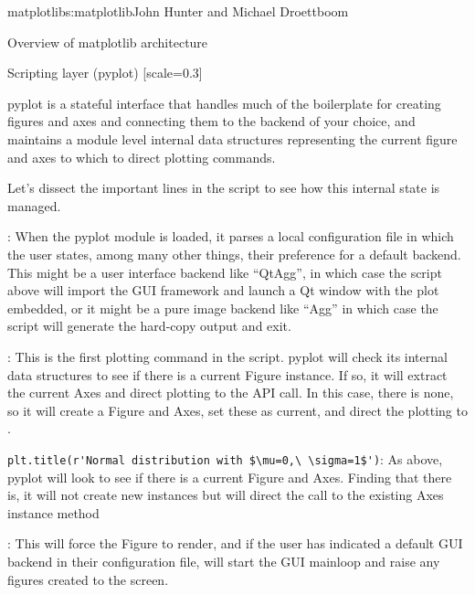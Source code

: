 \begin{aosachapter}{matplotlib}{s:matplotlib}{John Hunter and Michael Droettboom}
\begin{aosasect1}{Overview of matplotlib architecture}
\begin{aosasect2}{Scripting layer (pyplot)}
[scale=0.3]


pyplot is a stateful interface that handles much of the boilerplate
for creating figures and axes and connecting them to the backend of
your choice, and maintains a module level internal data structures
representing the current figure and axes to which to direct plotting
commands.

Let's dissect the important lines in the script to see how this
internal state is managed.

\begin{aosaitemize}

  \item {}: When the pyplot module
    is loaded, it parses a local configuration file in which the user
    states, among many other things, their preference for a default
    backend.  This might be a user interface backend like ``QtAgg'',
    in which case the script above will import the GUI framework and
    launch a Qt window with the plot embedded, or it might be a pure
    image backend like ``Agg'' in which case the script will generate
    the hard-copy output and exit.

  \item {}: This is the first plotting command
    in the script.  pyplot will check its internal data structures to
    see if there is a current Figure instance.  If so, it will extract
    the current Axes and direct plotting to the  API
    call.  In this case, there is none, so it will create a Figure and
    Axes, set these as current, and direct the plotting to
    .

  \item \verb+plt.title(r'Normal distribution with $\mu=0,\ \sigma=1$')+:
    As above, pyplot will look to see if there
    is a current Figure and Axes.  Finding that there is, it will not
    create new instances but will direct the call to the existing Axes
    instance method 

  \item {}: This will force the Figure to render, and
    if the user has indicated a default GUI backend in their
    configuration file, will start the GUI mainloop and raise any
    figures created to the screen.

\end{aosaitemize}


\end{aosasect2}
\end{aosasect1}
\end{aosachapter}
